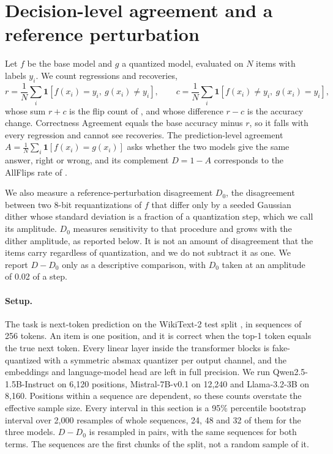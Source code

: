 \documentclass[10pt]{article}
\begin{document}
\section{Decision-level agreement and a reference perturbation}\label{sec:agree}

Let $f$ be the base model and $g$ a quantized model, evaluated on $N$ items with labels $y_i$.
We count regressions and recoveries,
\begin{equation}
r = \frac{1}{N}\sum_i \mathbf{1}[f(x_i)=y_i,\ g(x_i)\neq y_i], \qquad
c = \frac{1}{N}\sum_i \mathbf{1}[f(x_i)\neq y_i,\ g(x_i)=y_i],
\end{equation}
whose sum $r+c$ is the flip count of \citet{dutta2024accuracy}, and whose difference $r-c$ is
the accuracy change. Correctness Agreement \citep{rababah2026illusion} equals the base
accuracy minus $r$, so it falls with every regression and cannot see recoveries. The
prediction-level agreement $A = \frac{1}{N}\sum_i \mathbf{1}[f(x_i)=g(x_i)]$ asks whether the
two models give the same answer, right or wrong, and its complement $D = 1-A$ corresponds to
the AllFlips rate of \citet{dutta2024accuracy}.

We also measure a reference-perturbation disagreement $D_0$, the disagreement between two
8-bit requantizations of $f$ that differ only by a seeded Gaussian dither whose standard
deviation is a fraction of a quantization step, which we call its amplitude. $D_0$ measures sensitivity to that procedure and grows with the dither amplitude, as
reported below. It is not an amount of disagreement that the items carry regardless of
quantization, and we do not subtract it as one. We report $D - D_0$ only as a descriptive
comparison, with $D_0$ taken at an amplitude of 0.02 of a step.

\paragraph{Setup.} The task is next-token prediction on the WikiText-2 test split
\citep{merity2017pointer}, in sequences of 256 tokens. An item is one position, and it is
correct when the top-1 token equals the true next token. Every linear layer inside the
transformer blocks is fake-quantized with a symmetric absmax quantizer per output channel, and
the embeddings and language-model head are left in full precision. We run
Qwen2.5-1.5B-Instruct \citep{qwen2025qwen25} on 6{,}120 positions, Mistral-7B-v0.1
\citep{jiang2023mistral} on 12{,}240 and Llama-3.2-3B \citep{grattafiori2024llama3} on
8{,}160. Positions within a sequence are dependent, so these counts overstate the effective
sample size. Every interval in this section is a 95\% percentile bootstrap interval over 2{,}000 resamples
of whole sequences, 24, 48 and 32 of them for the three models. $D - D_0$ is resampled in pairs,
with the same sequences for both terms. The sequences are the first chunks of the split, not a
random sample of it.
\end{document}
